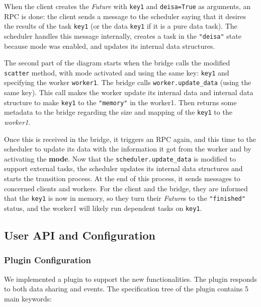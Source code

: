 When the client creates the \textit{Future} with \texttt{key1} and \texttt{deisa=True} as arguments, an RPC is done: the client sends a message to the scheduler saying that it desires the results of the task \texttt{key1} (or the data \texttt{key1} if it is a pure data task). The scheduler handles this message internally, creates a task in the \texttt{"deisa"} state because \deisa mode was enabled, and updates its internal data structures. 

The second part of the diagram starts when the bridge calls the modified \texttt{scatter} method, with \deisa mode activated and using the same key: \texttt{key1} and specifying the worker \texttt{worker1}. The bridge calls \texttt{worker.update\_data} (using the same key). This call makes the worker update its internal data and internal data structure to make \texttt{key1} to the \texttt{"memory"} in the worker1. Then returns some metadata to the bridge regarding the size and mapping of the \texttt{key1} to the \textit{worker1}.

Once this is received in the bridge, it triggers an RPC again, and this time to the scheduler to update its data with the information it got from the worker and by activating the \textbf{\deisa mode}. Now that the \texttt{scheduler.update\_data} is modified to support external tasks, the scheduler updates its internal data structures and starts the transition process. At the end of this process, it sends messages to concerned clients and workers. For the client and the bridge, they are informed that the \texttt{key1} is now in memory, so they turn their \textit{Future}s to the \texttt{"finished"} status, and the worker1 will likely run dependent tasks on \texttt{key1}.


\subsection{User API and Configuration}

\subsubsection{\deisa Plugin Configuration}

We implemented a \deisa plugin to support the new functionalities. The plugin responds to both data sharing and \pdi events. The specification tree of the plugin contains 5 main keywords:

